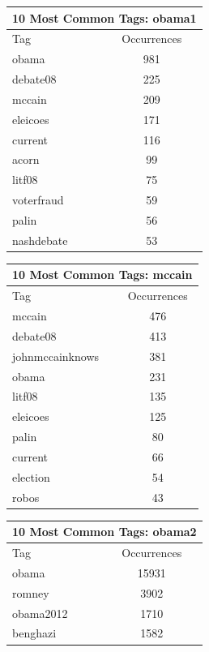 \documentclass[12pt,a4paper]{report}
\begin{document}
  \begin{table}[ht]
    \centering
    \begin{tabular}[t]{|l|c|}
      \hline
      \multicolumn{2}{|c|}{10 Most Common Tags: obama1} \\
      \hline
      \hline
      Tag & Occurrences \\ 
      \hline
      obama & 981 \\
      debate08 & 225 \\
      mccain & 209 \\
      eleicoes & 171 \\
      current & 116 \\
      acorn & 99 \\
      litf08 & 75 \\
      voterfraud & 59 \\
      palin & 56 \\
      nashdebate & 53 \\
      \hline
    \end{tabular}\hfill%
    \begin{tabular}[t]{|l|c|}
      \hline
      \multicolumn{2}{|c|}{10 Most Common Tags: mccain} \\
      \hline
      \hline
      Tag & Occurrences \\ [0.5ex]
      \hline
      mccain & 476 \\
      debate08 & 413 \\
      johnmccainknows & 381 \\
      obama & 231 \\
      litf08 & 135 \\
      eleicoes & 125 \\
      palin & 80 \\
      current & 66 \\
      election & 54 \\
      robos & 43 \\
      \hline
    \end{tabular}\hfill%
    \begin{tabular}[t]{|l|c|}
      \hline
      \multicolumn{2}{|c|}{10 Most Common Tags: obama2} \\
      \hline
      Tag & Occurrences \\ [0.5ex]
      \hline
      \hline
      obama & 15931 \\
      romney & 3902 \\
      obama2012 & 1710 \\
      benghazi & 1582 \\

\end{tabular}
\end{table}
\end{document}
